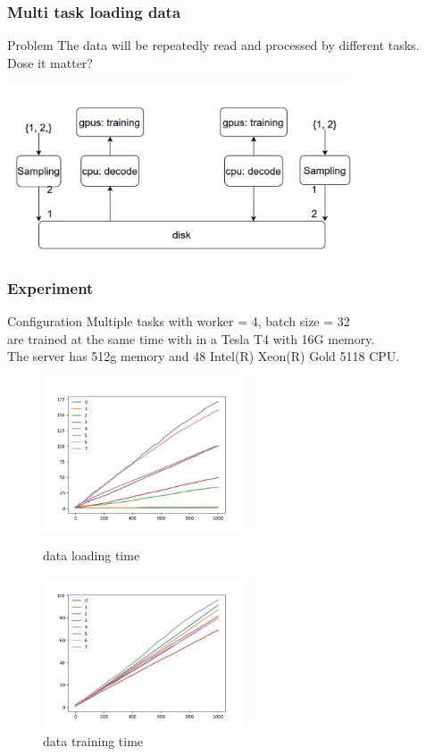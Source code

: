 \documentclass[notheorems, aspectratio=54]{beamer}
\begin{document}
\begin{frame}
    \frametitle{Multi task loading data}
    \begin{block}{Problem}
        The data will be repeatedly read and processed by different tasks. \\
        Dose it matter?
    \end{block}
    \begin{center}
        \includegraphics[height=5cm]{global_img_dir/multitask_dataloading.png}
    \end{center}
\end{frame}

\begin{frame}
    \frametitle{Experiment}
    \begin{block}{Configuration}
        Multiple tasks with worker = 4, batch size = 32 \\
        are trained at the same time with in a Tesla T4 with 16G memory. \\
        The server has 512g memory and 48 Intel(R) Xeon(R) Gold 5118 CPU.
    \end{block}
    \begin{figure}[htbp]
    \centering
    \begin{minipage}[t]{0.48\textwidth}
    \centering
    \includegraphics[width=6cm]{global_img_dir/l.jpg}
    \caption{data loading time}
    \end{minipage}
    \begin{minipage}[t]{0.48\textwidth}
    \centering
    \includegraphics[width=6cm]{global_img_dir/b.jpg}
    \caption{data training time}
    \end{minipage}
    \end{figure}
\end{frame}
\end{document}
